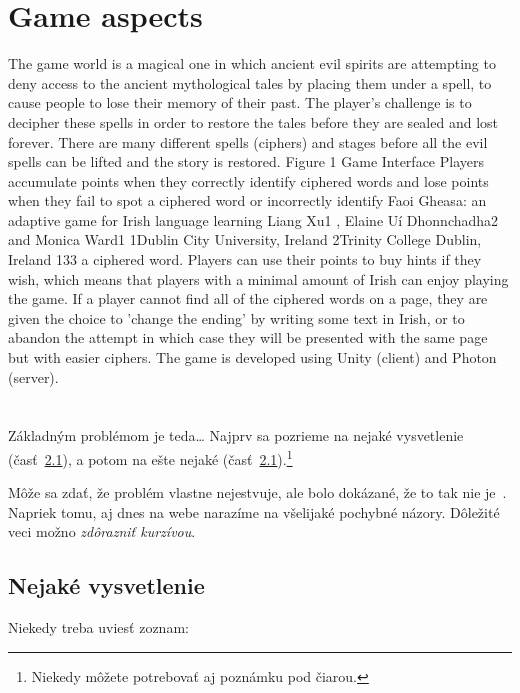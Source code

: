 \documentclass[10pt,twoside,english,a4paper]{article}
\begin{document}
\section{Game aspects }
The game world is a magical one in which ancient evil spirits are attempting to deny access to the ancient mythological tales by placing them under a spell, to cause people to lose their memory of their past. The player's challenge is to decipher these spells in order to restore the tales before they are sealed and lost forever. There are many different spells (ciphers) and stages before all the evil spells can be lifted and the story is restored. Figure 1 Game Interface Players accumulate points when they correctly identify ciphered words and lose points when they fail to spot a ciphered word or incorrectly identify Faoi Gheasa: an adaptive game for Irish language learning Liang Xu1 , Elaine Uí Dhonnchadha2 and Monica Ward1 1Dublin City University, Ireland 2Trinity College Dublin, Ireland 133  a ciphered word. Players can use their points to buy hints if they wish, which means that players with a minimal amount of Irish can enjoy playing the game. If a player cannot find all of the ciphered words on a page, they are given the choice to 'change the ending' by writing some text in Irish, or to abandon the attempt in which case they will be presented with the same page but with easier ciphers. The game is developed using Unity (client) and Photon (server).\\

\section{}


Základným problémom je teda\ldots{} Najprv sa pozrieme na nejaké vysvetlenie (časť~\ref{ina:nejake}), a potom na ešte nejaké (časť~\ref{ina:nejake}).\footnote{Niekedy môžete potrebovať aj poznámku pod čiarou.}

Môže sa zdať, že problém vlastne nejestvuje\cite{Coplien:MPD}, ale bolo dokázané, že to tak nie je~\cite{Czarnecki:Staged, Czarnecki:Progress}. Napriek tomu, aj dnes na webe narazíme na všelijaké pochybné názory\cite{PLP-Framework}. Dôležité veci možno \emph{zdôrazniť kurzívou}.
\subsection{Nejaké vysvetlenie} \label{ina:nejake}

Niekedy treba uviesť zoznam:
\end{document}
